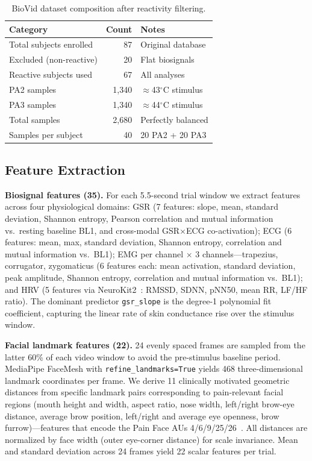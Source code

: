 \documentclass[sigconf]{acmart}
\begin{document}
\begin{table}[t]
\centering
\caption{BioVid dataset composition after reactivity filtering.}
\label{tab:dataset}
\begin{tabular}{@{}lrl@{}}
\toprule
Category & Count & Notes \\
\midrule
Total subjects enrolled     & 87    & Original database \\
Excluded (non-reactive)     & 20    & Flat biosignals   \\
Reactive subjects used      & 67    & All analyses      \\
\midrule
PA2 samples                 & 1,340 & $\approx$43$^\circ$C stimulus \\
PA3 samples                 & 1,340 & $\approx$44$^\circ$C stimulus \\
Total samples               & 2,680 & Perfectly balanced \\
Samples per subject         & 40    & 20 PA2 + 20 PA3   \\
\bottomrule
\end{tabular}
\end{table}

\subsection{Feature Extraction}

\textbf{Biosignal features (35).}
For each 5.5-second trial window we extract features across four physiological
domains: GSR (7 features: slope, mean, standard deviation, Shannon entropy,
Pearson correlation and mutual information vs.\ resting baseline BL1, and
cross-modal GSR$\times$ECG co-activation); ECG (6 features: mean, max,
standard deviation, Shannon entropy, correlation and mutual information vs.\
BL1); EMG per channel $\times$ 3 channels---trapezius, corrugator,
zygomaticus (6 features each: mean activation, standard deviation, peak
amplitude, Shannon entropy, correlation and mutual information vs.\ BL1);
and HRV (5 features via NeuroKit2~\cite{makowski2021}: RMSSD, SDNN, pNN50,
mean RR, LF/HF ratio). The dominant predictor \texttt{gsr\_slope} is the
degree-1 polynomial fit coefficient, capturing the linear rate of skin
conductance rise over the stimulus window.

\textbf{Facial landmark features (22).}
24 evenly spaced frames are sampled from the latter 60\% of each video window
to avoid the pre-stimulus baseline period. MediaPipe FaceMesh with
\texttt{refine\_landmarks=True} yields 468 three-dimensional landmark
coordinates per frame. We derive 11 clinically motivated geometric distances
from specific landmark pairs corresponding to pain-relevant facial regions
(mouth height and width, aspect ratio, nose width, left/right brow-eye
distance, average brow position, left/right and average eye openness, brow
furrow)---features that encode the Pain Face AUs 4/6/9/25/26~\cite{prkachin2008}.
All distances are normalized by face width (outer eye-corner distance) for
scale invariance. Mean and standard deviation across 24 frames yield 22 scalar
features per trial.
\end{document}

